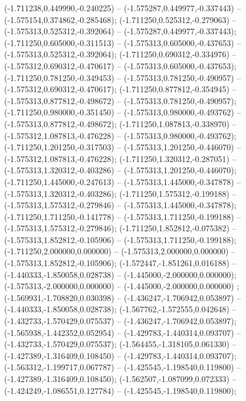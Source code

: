  (-1.711238,0.449990,-0.240225) -- (-1.575287,0.449977,-0.337443) -- (-1.575154,0.374862,-0.285468);
 (-1.711250,0.525312,-0.279063) -- (-1.575313,0.525312,-0.392064) -- (-1.575287,0.449977,-0.337443);
 (-1.711250,0.605000,-0.311513) -- (-1.575313,0.605000,-0.437653) -- (-1.575313,0.525312,-0.392064);
 (-1.711250,0.690312,-0.334976) -- (-1.575312,0.690312,-0.470617) -- (-1.575313,0.605000,-0.437653);
 (-1.711250,0.781250,-0.349453) -- (-1.575313,0.781250,-0.490957) -- (-1.575312,0.690312,-0.470617);
 (-1.711250,0.877812,-0.354945) -- (-1.575313,0.877812,-0.498672) -- (-1.575313,0.781250,-0.490957);
 (-1.711250,0.980000,-0.351450) -- (-1.575313,0.980000,-0.493762) -- (-1.575313,0.877812,-0.498672);
 (-1.711250,1.087813,-0.338970) -- (-1.575312,1.087813,-0.476228) -- (-1.575313,0.980000,-0.493762);
 (-1.711250,1.201250,-0.317503) -- (-1.575313,1.201250,-0.446070) -- (-1.575312,1.087813,-0.476228);
 (-1.711250,1.320312,-0.287051) -- (-1.575313,1.320312,-0.403286) -- (-1.575313,1.201250,-0.446070);
 (-1.711250,1.445000,-0.247613) -- (-1.575313,1.445000,-0.347878) -- (-1.575313,1.320312,-0.403286);
 (-1.711250,1.575312,-0.199188) -- (-1.575313,1.575312,-0.279846) -- (-1.575313,1.445000,-0.347878);
 (-1.711250,1.711250,-0.141778) -- (-1.575313,1.711250,-0.199188) -- (-1.575313,1.575312,-0.279846);
 (-1.711250,1.852812,-0.075382) -- (-1.575313,1.852812,-0.105906) -- (-1.575313,1.711250,-0.199188);
 (-1.711250,2.000000,0.000000) -- (-1.575313,2.000000,0.000000) -- (-1.575313,1.852812,-0.105906);
 (-1.572447,-1.851261,0.016188) -- (-1.440333,-1.850058,0.028738) -- (-1.445000,-2.000000,0.000000);
 (-1.575313,-2.000000,0.000000) -- (-1.445000,-2.000000,0.000000) ;
 (-1.569931,-1.708820,0.030398) -- (-1.436247,-1.706942,0.053897) -- (-1.440333,-1.850058,0.028738);
 (-1.567762,-1.572555,0.042648) -- (-1.432733,-1.570429,0.075537) -- (-1.436247,-1.706942,0.053897);
 (-1.565938,-1.442352,0.052954) -- (-1.429783,-1.440314,0.093707) -- (-1.432733,-1.570429,0.075537);
 (-1.564455,-1.318105,0.061330) -- (-1.427389,-1.316409,0.108450) -- (-1.429783,-1.440314,0.093707);
 (-1.563312,-1.199717,0.067787) -- (-1.425545,-1.198540,0.119800) -- (-1.427389,-1.316409,0.108450);
 (-1.562507,-1.087099,0.072333) -- (-1.424249,-1.086551,0.127784) -- (-1.425545,-1.198540,0.119800);
